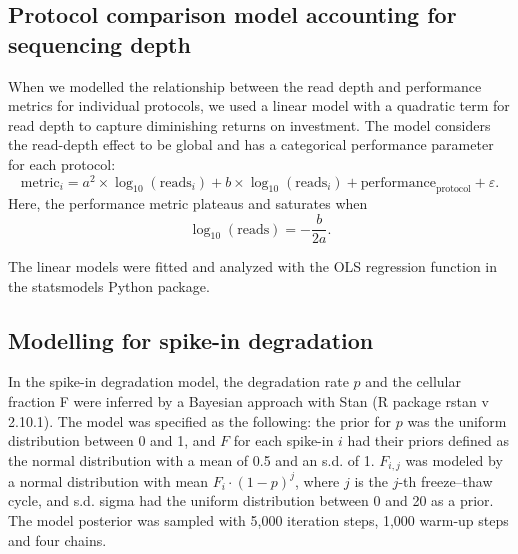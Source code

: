 \subsection{Protocol comparison model accounting for sequencing depth}

When we modelled the relationship between the read depth and performance metrics for individual protocols, we used a linear model with a quadratic term for read depth to capture diminishing returns on investment. The model considers the read-depth effect to be global and has a categorical performance parameter for each protocol:
\[
\text{metric}_i = a^2 \times \log_{10}(\text{reads}_i) + b \times \log_{10}(\text{reads}_i) +  \text{performance}_\text{protocol} + \varepsilon.
\]
Here, the performance metric plateaus and saturates when
\[
\log_{10} (\text{reads}) = - \frac{b}{2a}.
\]

The linear models were fitted and analyzed with the OLS regression function in the statsmodels Python package.

\subsection{Modelling for spike-in degradation}

In the spike-in degradation model, the degradation rate \( p \) and the cellular fraction F were inferred by a Bayesian approach with Stan \cite{Carpenter2016-zx} (R package rstan v 2.10.1). The model was specified as the following: the prior for \( p \) was the uniform distribution between 0 and 1, and \( F \) for each spike-in \( i \) had their priors defined as the normal distribution with a mean of 0.5 and an s.d. of 1. \( F_{i,j} \) was modeled by a normal distribution with mean \( F_i \cdot (1 - p)^j \), where \( j \) is the \( j \)-th freeze–thaw cycle, and s.d. {sigma} had the uniform distribution between 0 and 20 as a prior. The model posterior was sampled with 5,000 iteration steps, 1,000 warm-up steps and four chains.
